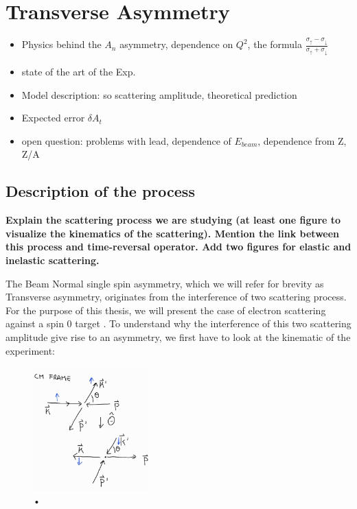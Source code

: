 
\chapter{Transverse Asymmetry} \label{transv}

\begin{itemize}

\item Physics behind the $A_{n}$ asymmetry, dependence on $Q^{2}$, the formula $\frac{\sigma_{\uparrow} - \sigma_{\downarrow}}{\sigma_{\uparrow} + \sigma_{\downarrow}}$
\item state of the art of the Exp.
\item Model description: so scattering amplitude, theoretical prediction
\item Expected error $ \delta A_{t} $
\item open question: problems with lead, dependence of $E_{beam}$, dependence from Z, Z/A
\end{itemize}

\section{Description of the process}

{\bfseries Explain the scattering process we are studying (at least one figure to visualize the kinematics of the scattering). Mention the link between this process and time-reversal operator. Add two figures for elastic and inelastic scattering.} 

The Beam Normal single spin asymmetry, which we will refer for brevity as Transverse asymmetry, originates from the interference of two scattering process. For the purpose of this thesis, we will present the case of electron scattering against a spin $0$ target \cite{Gorchtein_2008}.
To understand why the interference of this two scattering amplitude give rise to an asymmetry, we first have to look at the kinematic of the experiment: 

\begin{figure}[hbtp]
\centering
\includegraphics[width = 0.4\textwidth]{figures/Kinematic.jpg}
\caption{•}
\end{figure}

